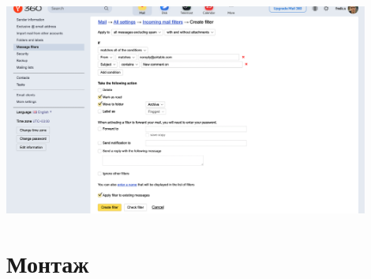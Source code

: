 \documentclass[
a4paper, %
12pt, %
article,
onecolumn, %
openany, %
]{memoir}
\begin{document}
\begin{enumerate}
	    \begin{center} 
	        \includegraphics[width=0.9\textwidth]{AirTableSpam/ya2} 
	    \end{center}

\end{enumerate}

\newpage
\section{Монтаж}\label{montageRules}
\end{document}
